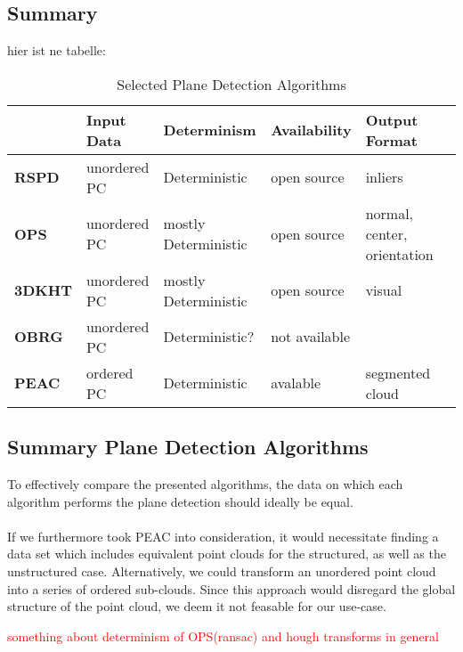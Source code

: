 \documentclass[main.tex]{subfiles}
\begin{document}
\subsection*{Summary}
hier ist ne tabelle:
\begin{table}[!h]
    \centering
    \begin{tabular}{|l|l|l|l|l|l}
        \hline
                       & \textbf{Input Data} & \textbf{Determinism} & \textbf{Availability} & \textbf{Output Format}      \\ \hline
        \textbf{RSPD}  & unordered PC        & Deterministic        & open source           & inliers                     \\ \hline
        \textbf{OPS}   & unordered PC        & mostly Deterministic & open source           & normal, center, orientation \\ \hline
        \textbf{3DKHT} & unordered PC        & mostly Deterministic & open source           & visual                      \\ \hline
        \textbf{OBRG}  & unordered PC        & Deterministic?       & not available         &                             \\ \hline
        \textbf{PEAC}  & ordered PC          & Deterministic        & avalable              & segmented cloud             \\ \hline
    \end{tabular}
    \caption{Selected Plane Detection Algorithms}
    \label{tab:my-table}
\end{table}

\subsection*{Summary Plane Detection Algorithms}
To effectively compare the presented algorithms, the data on which each algorithm performs the plane detection should ideally be equal. \\ \\
If we furthermore took PEAC into consideration, it would necessitate finding a data set which includes equivalent point clouds for the structured, as well as
the unstructured case. Alternatively, we could transform an unordered point cloud into a series of ordered sub-clouds.
Since this approach would disregard the global structure of the point cloud, we deem it not feasable for our use-case.

\textcolor{red}{something about determinism of OPS(ransac) and hough transforms in general }
\end{document}
